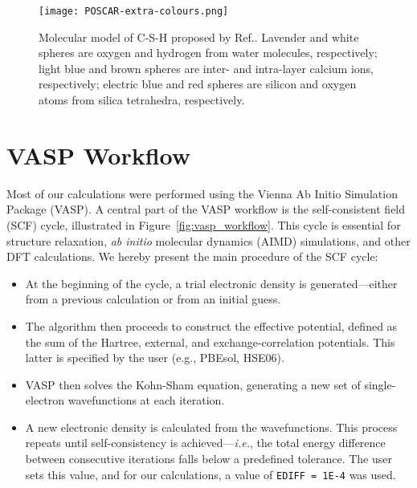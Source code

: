 \begin{figure}[h]
    \centering
    \texttt{[image: POSCAR-extra-colours.png]}
    \caption{Molecular model of C-S-H proposed by Ref.\supercite{Pellenq2009}. Lavender and white spheres are oxygen and hydrogen from water molecules, respectively; light blue and brown spheres are inter- and intra-layer calcium ions, respectively; electric blue and red spheres are silicon and oxygen atoms from silica tetrahedra, respectively.}
    \label{fig:csh_structure}
\end{figure}

\section{VASP Workflow}
Most of our calculations were performed using the Vienna Ab Initio Simulation Package (VASP). A central part of the VASP workflow is the self-consistent field (SCF) cycle, illustrated in Figure~\ref{fig:vasp_workflow}. This cycle is essential for structure relaxation, \emph{ab initio} molecular dynamics (AIMD) simulations, and other DFT calculations. We hereby present the main procedure of the SCF cycle:

\begin{itemize}
    \item At the beginning of the cycle, a trial electronic density is generated---either from a previous calculation or from an initial guess. 
    \item The algorithm then proceeds to construct the effective potential, defined as the sum of the Hartree, external, and exchange-correlation potentials. This latter is specified by the user (e.g., PBEsol, HSE06).
    \item VASP then solves the Kohn-Sham equation, generating a new set of single-electron wavefunctions at each iteration. 
    \item A new electronic density is calculated from the wavefunctions. This process repeats until self-consistency is achieved---\emph{i.e.}, the total energy difference between consecutive iterations falls below a predefined tolerance. The user sets this value, and for our calculations, a value of \texttt{EDIFF = 1E-4} was used. 
\end{itemize}




